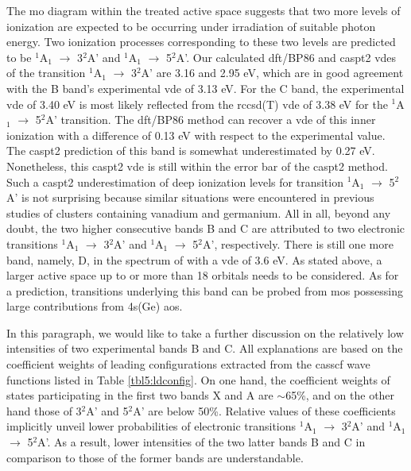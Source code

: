 \begin{refsection}
The \acrshort{mo} diagram within the treated active space suggests that two more levels of ionization are expected to be occurring under irradiation of suitable photon energy. Two ionization processes corresponding to these two levels are predicted to be $^1$A$_1$ $\longrightarrow$ 3$^2$A' and $^1$A$_1$ $\longrightarrow$ 5$^2$A'. Our calculated \acrshort{dft}/BP86 and \acrshort{caspt2} \acrshort{vde}s of the transition $^1$A$_1$ $\longrightarrow$ 3$^2$A' are 3.16 and 2.95 eV, which are in good agreement with the B band’s experimental \acrshort{vde} of 3.13 eV. For the C band, the experimental \acrshort{vde} of 3.40 eV is most likely reflected from the \acrshort{rccsd}(T) \acrshort{vde} of 3.38 eV for the $^1$A$_1$ $\longrightarrow$ 5$^2$A' transition. The \acrshort{dft}/BP86 method can recover a \acrshort{vde} of this inner ionization with a difference of 0.13 eV with respect to the experimental value. The \acrshort{caspt2} prediction of this band is somewhat underestimated by 0.27 eV. Nonetheless, this \acrshort{caspt2} \acrshort{vde} is still within the error bar of the \acrshort{caspt2} method. Such a \acrshort{caspt2} underestimation of deep ionization levels for transition $^1$A$_1$ $\longrightarrow$ 5$^2$A' is not surprising because similar situations were encountered in previous studies of clusters containing vanadium \cite{c5:32} and germanium. \cite{c5:16} All in all, beyond any doubt, the two higher consecutive bands B and C are attributed to two electronic transitions $^1$A$_1$ $\longrightarrow$ 3$^2$A' and $^1$A$_1$ $\longrightarrow$ 5$^2$A', respectively. There is still one more band, namely, D, in the spectrum of  with a \acrshort{vde} of 3.6 eV. As stated above, a larger active space up to or more than 18 orbitals needs to be considered. As for a prediction, transitions underlying this band can be probed from \acrshort{mo}s possessing large contributions from 4s(Ge) \acrshort{ao}s. 




In this paragraph, we would like to take a further discussion on the relatively low intensities of two experimental bands B and C. All explanations are based on the coefficient weights of leading configurations extracted from the \acrshort{casscf} wave functions listed in Table \ref{tbl5:ldconfig}. On one hand, the coefficient weights of states participating in the first two bands X and A are $\sim$65\%, and on the other hand those of 3$^2$A' and 5$^2$A' are below 50\%. Relative values of these coefficients implicitly unveil lower probabilities of electronic transitions $^1$A$_1$ $\longrightarrow$ 3$^2$A' and $^1$A$_1$ $\longrightarrow$ 5$^2$A'. As a result, lower intensities of the two latter bands B and C in comparison to those of the former bands are understandable.






\end{refsection}

